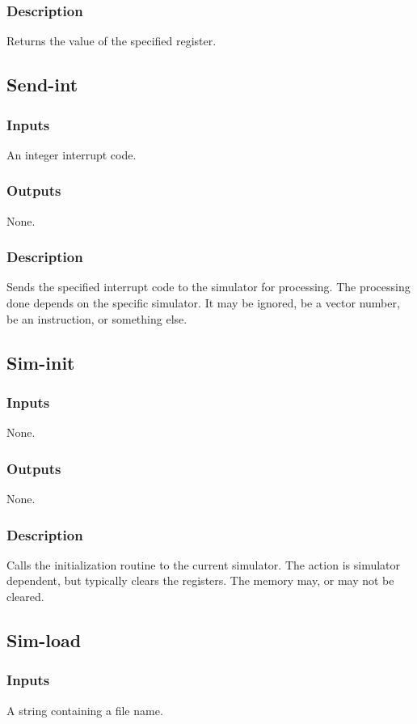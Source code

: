 \documentclass[10pt, openany]{book}
\begin{document}
\subsubsection{Description}
Returns the value of the specified register.

\subsection{Send-int}
\subsubsection{Inputs}
An integer interrupt code.
\subsubsection{Outputs}
None.
\subsubsection{Description}
Sends the specified interrupt code to the simulator for processing.  The processing done depends on the specific simulator.  It may be ignored, be a vector number, be an instruction, or something else.

\subsection{Sim-init}
\subsubsection{Inputs}
None.
\subsubsection{Outputs}
None.
\subsubsection{Description}
Calls the initialization routine to the current simulator.  The action is simulator dependent, but typically clears the registers.  The memory may, or may not be cleared.

\subsection{Sim-load}
\subsubsection{Inputs}
A string containing a file name.
\end{document}
